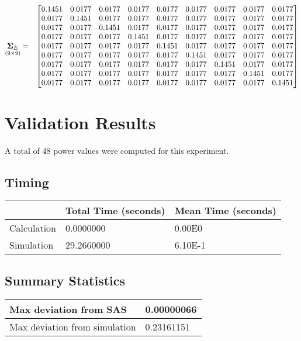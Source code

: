 \documentclass{glimmpse-report}
\begin{document}
\begin{eqnarray*}
\underset{\left(9\times9\right)}{\mathbf{\Sigma}_E} & = & \begin{bmatrix}0.1451 & 0.0177 & 0.0177 & 0.0177 & 0.0177 & 0.0177 & 0.0177 & 0.0177 & 0.0177\protect\\
0.0177 & 0.1451 & 0.0177 & 0.0177 & 0.0177 & 0.0177 & 0.0177 & 0.0177 & 0.0177\protect\\
0.0177 & 0.0177 & 0.1451 & 0.0177 & 0.0177 & 0.0177 & 0.0177 & 0.0177 & 0.0177\protect\\
0.0177 & 0.0177 & 0.0177 & 0.1451 & 0.0177 & 0.0177 & 0.0177 & 0.0177 & 0.0177\protect\\
0.0177 & 0.0177 & 0.0177 & 0.0177 & 0.1451 & 0.0177 & 0.0177 & 0.0177 & 0.0177\protect\\
0.0177 & 0.0177 & 0.0177 & 0.0177 & 0.0177 & 0.1451 & 0.0177 & 0.0177 & 0.0177\protect\\
0.0177 & 0.0177 & 0.0177 & 0.0177 & 0.0177 & 0.0177 & 0.1451 & 0.0177 & 0.0177\protect\\
0.0177 & 0.0177 & 0.0177 & 0.0177 & 0.0177 & 0.0177 & 0.0177 & 0.1451 & 0.0177\protect\\
0.0177 & 0.0177 & 0.0177 & 0.0177 & 0.0177 & 0.0177 & 0.0177 & 0.0177 & 0.1451\protect\\
\end{bmatrix}
\end{eqnarray*}
\section{Validation Results}
A total of 48 power values were computed for this experiment.

\subsection{Timing}
\begin{tabular}{|l|l|l|}
\hline
 & Total Time (seconds) & Mean Time (seconds) \\ 
\hline
Calculation & 0.0000000 & 0.00E0\tabularnewline
\hline
Simulation & 29.2660000 & 6.10E-1\tabularnewline
\hline
\end{tabular}
\subsection{Summary Statistics}
\begin{tabular}{|l|l|}
\hline
Max deviation from SAS & 0.00000066\tabularnewline
\hline

Max deviation from simulation & 0.23161151\tabularnewline
\hline

\end{tabular}
\end{document}
